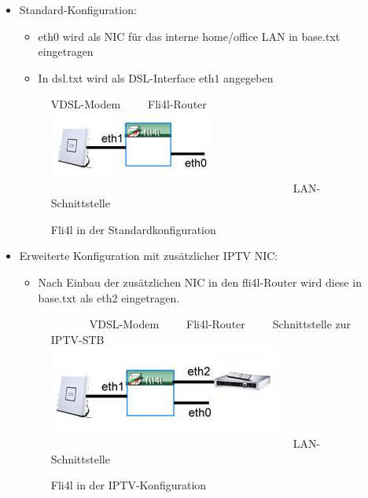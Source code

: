 \begin{itemize}
   \item{Standard-Konfiguration:
         \begin{itemize}
            \item{eth0 wird als NIC für das interne home/office LAN in base.txt
eingetragen}
            \item{In dsl.txt wird als DSL-Interface eth1 angegeben}
         \end{itemize}
         \begin{figure}[ht!]
         \centering
         \selectfont
VDSL-Modem~~~~~Fli4l-Router~~~~~~~~~~~~~~~~\\
         \includegraphics[]{image001}\\
         ~~~~~~~~~~~~~~~~~~~~~~~~~~~~~~~~~~~~~~~~~~~~LAN-Schnittstelle
         \caption{Fli4l in der Standardkonfiguration}
         \label{fig:standardconfig}
         \end{figure}
      }
   \item{Erweiterte Konfiguration mit zusätzlicher IPTV NIC:
         \begin{itemize}
            \item{Nach Einbau der zusätzlichen NIC in den fli4l-Router wird
diese in base.txt als eth2 eingetragen.} \end{itemize}
         \begin{figure}[ht!]
         \centering
         \selectfont
~~~~~~~VDSL-Modem~~~~~Fli4l-Router~~~~~Schnittstelle zur IPTV-STB\\
         \includegraphics[]{image002}\\
         ~~~~~~~~~~~~~~~~~~~~~~~~~~~~~~~~~~~~~~~~~~~~LAN-Schnittstelle
         \caption{Fli4l in der IPTV-Konfiguration}
         \label{fig:iptvconfig}
         \end{figure}
      }
\end{itemize}


